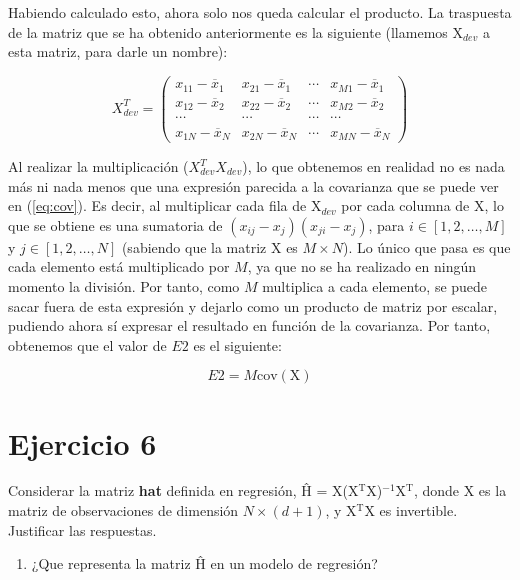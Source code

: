 \documentclass[11pt,a4paper]{article}
\newcommand{\cov}{\text{cov}}
\begin{document}
Habiendo calculado esto, ahora solo nos queda calcular el producto. La traspuesta de la matriz que se ha obtenido
anteriormente es la siguiente (llamemos X$_{dev}$ a esta matriz, para darle un nombre):

\begin{equation}
\label{eq:x1t}
X_{dev}^T = 
\left(
{
\begin{array}{cccc}
	x_{11} - \overline{x}_{1} & x_{21} - \overline{x}_{1} & \cdots & x_{M1} - \overline{x}_{1} \\
	x_{12} - \overline{x}_{2} & x_{22} - \overline{x}_{2} & \cdots & x_{M2} - \overline{x}_{2} \\
	\cdots & \cdots & \cdots & \cdots \\
	x_{1N} - \overline{x}_{N} & x_{2N} - \overline{x}_{N} & \cdots & x_{MN} - \overline{x}_{N}
\end{array}
}
\right)
\end{equation}

Al realizar la multiplicación ($X_{dev}^TX_{dev}$), lo que obtenemos en realidad no es nada más ni nada menos que una
expresión parecida a la covarianza que se puede ver en (\ref{eq:cov}). Es decir, al multiplicar cada fila de  X$_{dev}$ por
cada columna de X, lo que se obtiene es una sumatoria de $(x_{ij} - x_j)(x_{ji} - x_j)$, para $i \in [1, 2, \dots, M]$ y $j
\in [1, 2, \dots, N]$ (sabiendo que la matriz X es $M \times N$). Lo único que pasa es que cada elemento está multiplicado por
$M$, ya que no se ha realizado en ningún momento la división. Por tanto, como $M$ multiplica a cada elemento, se puede sacar
fuera de esta expresión y dejarlo como un producto de matriz por escalar, pudiendo ahora sí expresar el resultado en función
de la covarianza. Por tanto, obtenemos que el valor de $E2$ es el siguiente:

\begin{equation}
	E2 = M \cov(\text{X})
\end{equation}

\section*{Ejercicio 6}

\noindent Considerar la matriz \textbf{hat} definida en regresión, Ĥ = X(X$^\text{T}$X)$^{-1}$X$^\text{T}$, donde X es la
matriz de observaciones de dimensión $N \times (d + 1)$, y X$^\text{T}$X es invertible. Justificar las respuestas.

\begin{enumerate}[label=\textit{\alph*})]
	\item ¿Que representa la matriz Ĥ en un modelo de regresión?
\end{enumerate}
\end{document}
